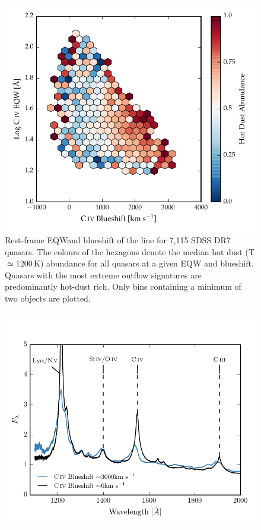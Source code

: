 \begin{figure}
\centering
  \includegraphics[width=\columnwidth]{figures/chapter05/hot_dust_beta.pdf}
\caption{Rest-frame \ac{EQW}and blueshift of the  line for 7,115 SDSS DR7 quasars. The colours of the hexagons denote the median hot dust (T$\simeq$1200\,K) abundance for all quasars at a given \ac{EQW} and blueshift. Quasars with the most extreme outflow signatures are predominantly hot-dust rich. Only bins containing a minimum of two objects are plotted. }
  \label{fig:hot_dust_beta}
\end{figure}

\begin{figure}
\centering
  \includegraphics[width=\columnwidth]{figures/chapter05/blueshift_composite.pdf}
\caption{}
  \label{fig:blueshift_composite}
\end{figure}

